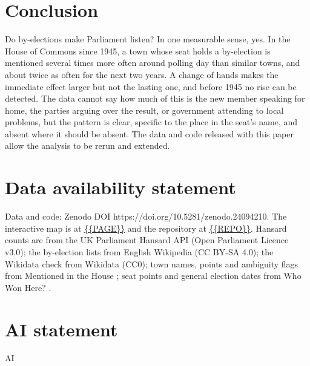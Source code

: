 \documentclass[11pt,a4paper]{article}
\begin{document}
\section{Conclusion}\label{sec:conc}
Do by-elections make Parliament listen? In one measurable sense, yes. In the House of Commons since 1945, a town whose seat holds a by-election is mentioned several times more often around polling day than similar towns, and about twice as often for the next two years. A change of hands makes the immediate effect larger but not the lasting one, and before 1945 no rise can be detected. The data cannot say how much of this is the new member speaking for home, the parties arguing over the result, or government attending to local problems, but the pattern is clear, specific to the place in the seat's name, and absent where it should be absent. The data and code released with this paper allow the analysis to be rerun and extended.

\section*{Data availability statement}
Data and code: Zenodo DOI https://doi.org/10.5281/zenodo.24094210. The interactive map is at \url{{{PAGE}}} and the repository at \url{{{REPO}}}. Hansard counts are from the UK Parliament Hansard API (Open Parliament Licence v3.0); the by-election lists from English Wikipedia (CC BY-SA 4.0); the Wikidata check from Wikidata (CC0); town names, points and ambiguity flags from Mentioned in the House \citep{hotham2026a}; seat points and general election dates from Who Won Here? \citep{hotham2026b}.

\section*{AI statement}
{{AI}}
\end{document}
